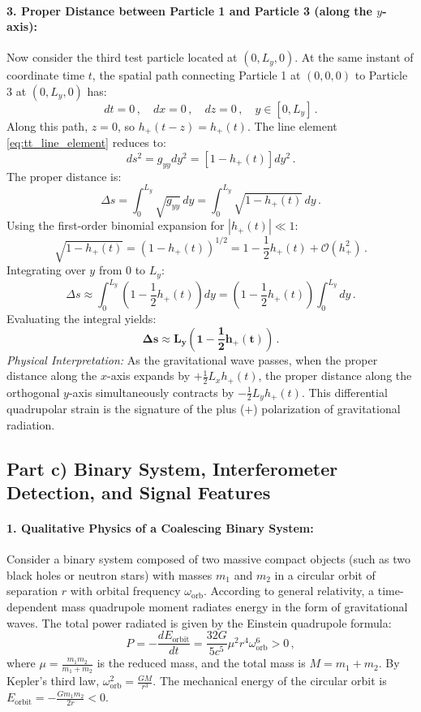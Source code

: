 \documentclass[12pt]{article}
\newcommand{\be}{\begin{equation}}
\newcommand{\ee}{\end{equation}}
\begin{document}
\paragraph{3. Proper Distance between Particle 1 and Particle 3 (along the $y$-axis):}
Now consider the third test particle located at $(0, L_y, 0)$. At the same instant of coordinate time $t$, the spatial path connecting Particle 1 at $(0,0,0)$ to Particle 3 at $(0,L_y,0)$ has:
\be
dt = 0 \,, \quad dx = 0 \,, \quad dz = 0 \,, \quad y \in [0, L_y] \,.
\ee
Along this path, $z = 0$, so $h_+(t - z) = h_+(t)$.
The line element \eqref{eq:tt_line_element} reduces to:
\be
ds^2 = g_{yy} dy^2 = \left[ 1 - h_+(t) \right] dy^2 \,.
\ee
The proper distance is:
\be
\Delta s = \int_0^{L_y} \sqrt{g_{yy}} \, dy = \int_0^{L_y} \sqrt{1 - h_+(t)} \, dy \,.
\ee
Using the first-order binomial expansion for $|h_+(t)| \ll 1$:
\be
\sqrt{1 - h_+(t)} = \left( 1 - h_+(t) \right)^{1/2} = 1 - \frac{1}{2} h_+(t) + \mathcal{O}(h_+^2) \,.
\ee
Integrating over $y$ from $0$ to $L_y$:
\be
\Delta s \approx \int_0^{L_y} \left( 1 - \frac{1}{2} h_+(t) \right) dy = \left( 1 - \frac{1}{2} h_+(t) \right) \int_0^{L_y} dy \,.
\ee
Evaluating the integral yields:
\be
\mathbf{\Delta s \approx L_y \left( 1 - \frac{1}{2} h_{+}(t) \right)} \,.
\ee
\emph{Physical Interpretation:} As the gravitational wave passes, when the proper distance along the $x$-axis expands by $+\frac{1}{2} L_x h_+(t)$, the proper distance along the orthogonal $y$-axis simultaneously contracts by $-\frac{1}{2} L_y h_+(t)$. This differential quadrupolar strain is the signature of the plus ($+$) polarization of gravitational radiation.

\subsection*{Part c) Binary System, Interferometer Detection, and Signal Features}

\paragraph{1. Qualitative Physics of a Coalescing Binary System:}
Consider a binary system composed of two massive compact objects (such as two black holes or neutron stars) with masses $m_1$ and $m_2$ in a circular orbit of separation $r$ with orbital frequency $\omega_{\text{orb}}$.
According to general relativity, a time-dependent mass quadrupole moment radiates energy in the form of gravitational waves. The total power radiated is given by the Einstein quadrupole formula:
\be
P = - \frac{dE_{\text{orbit}}}{dt} = \frac{32 G}{5 c^5} \mu^2 r^4 \omega_{\text{orb}}^6 > 0 \,,
\label{eq:quadrupole_power}
\ee
where $\mu = \frac{m_1 m_2}{m_1 + m_2}$ is the reduced mass, and the total mass is $M = m_1 + m_2$.
By Kepler's third law, $\omega_{\text{orb}}^2 = \frac{GM}{r^3}$. The mechanical energy of the circular orbit is $E_{\text{orbit}} = - \frac{G m_1 m_2}{2r} < 0$. 
\end{document}
